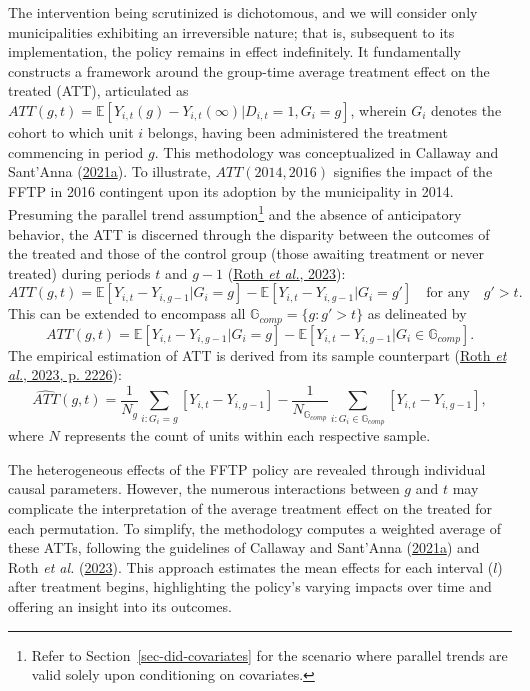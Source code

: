 \documentclass[12pt, a4paper, twoside]{article}
\numberwithin{equation}{subsection} %
\begin{document}
The intervention being scrutinized is dichotomous, and we will consider
only municipalities exhibiting an irreversible nature; that is,
subsequent to its implementation, the policy remains in effect
indefinitely. It fundamentally constructs a framework around the
group-time average treatment effect on the treated (ATT), articulated as
\(ATT(g, t) = \mathbb{E}[Y_{i,t}(g) - Y_{i,t}(\infty) | D_{i,t} = 1, G_i = g]\),
wherein \(G_i\) denotes the cohort to which unit \(i\) belongs, having
been administered the treatment commencing in period \(g\). This
methodology was conceptualized in Callaway and Sant'Anna
(\protect\hyperlink{ref-CALLAWAY2021200}{2021a}). To illustrate,
\(ATT(2014, 2016)\) signifies the impact of the FFTP in 2016 contingent
upon its adoption by the municipality in 2014. Presuming the parallel
trend assumption\footnote{Refer to Section~\ref{sec-did-covariates} for
  the scenario where parallel trends are valid solely upon conditioning
  on covariates.} and the absence of anticipatory behavior, the ATT is
discerned through the disparity between the outcomes of the treated and
those of the control group (those awaiting treatment or never treated)
during periods \(t\) and \(g-1\)
(\protect\hyperlink{ref-roth_whats_2023}{Roth \emph{et al.}, 2023}):
\begin{equation*} 
    ATT(g, t) = \mathbb{E}[Y_{i,t} - Y_{i,g-1} | G_i = g] -  \mathbb{E}[Y_{i,t} - Y_{i,g-1} | G_i = g'] \quad \text{for any} \quad g' > t.
\end{equation*} This can be extended to encompass all
\(\mathbb{G}_{comp} = \{g: g' > t\}\) as delineated by
\begin{equation} \label{eq-att}
    ATT(g, t) = \mathbb{E}[Y_{i,t} - Y_{i,g-1} | G_i = g] -  \mathbb{E}[Y_{i,t} - Y_{i,g-1} | G_i \in \mathbb{G}_{comp}].
\end{equation} The empirical estimation of ATT is derived from its
sample counterpart (\protect\hyperlink{ref-roth_whats_2023}{Roth
\emph{et al.}, 2023, p. 2226}):
\begin{equation} \label{eq-att-estimator}
    \widehat{ATT}(g, t) = \frac{1}{N_g} \sum_{i:G_i=g} \left[ Y_{i,t} - Y_{i,g-1} \right] -  \frac{1}{N_{\mathbb{G}_{comp}}} \sum_{i:G_i \in \mathbb{G}_{comp}} \left[ Y_{i,t} - Y_{i,g-1} \right],
\end{equation} where \(N\) represents the count of units within each
respective sample.

The heterogeneous effects of the FFTP policy are revealed through
individual causal parameters. However, the numerous interactions between
\(g\) and \(t\) may complicate the interpretation of the average
treatment effect on the treated for each permutation. To simplify, the
methodology computes a weighted average of these ATTs, following the
guidelines of Callaway and Sant'Anna
(\protect\hyperlink{ref-CALLAWAY2021200}{2021a}) and Roth \emph{et al.}
(\protect\hyperlink{ref-roth_whats_2023}{2023}). This approach estimates
the mean effects for each interval (\(l\)) after treatment begins,
highlighting the policy's varying impacts over time and offering an
insight into its outcomes.
\end{document}
